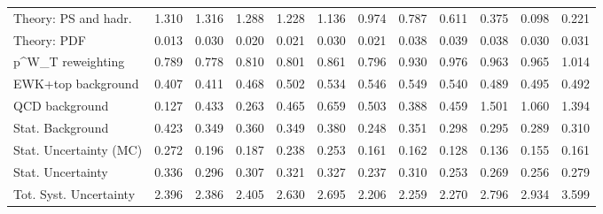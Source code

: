 \begin{tabular}{l|p{0.6cm}p{0.6cm}p{0.6cm}p{0.6cm}p{0.6cm}p{0.6cm}p{0.6cm}p{0.6cm}p{0.6cm}p{0.6cm}p{0.6cm}}
Theory: PS and hadr.                     & 1.310 & 1.316 & 1.288 & 1.228 & 1.136 & 0.974 & 0.787 & 0.611 & 0.375 & 0.098 & 0.221 \\
Theory: PDF                              & 0.013 & 0.030 & 0.020 & 0.021 & 0.030 & 0.021 & 0.038 & 0.039 & 0.038 & 0.030 & 0.031 \\
p^{W}_{T} reweighting                    & 0.789 & 0.778 & 0.810 & 0.801 & 0.861 & 0.796 & 0.930 & 0.976 & 0.963 & 0.965 & 1.014 \\
EWK+top background                       & 0.407 & 0.411 & 0.468 & 0.502 & 0.534 & 0.546 & 0.549 & 0.540 & 0.489 & 0.495 & 0.492 \\
QCD background                           & 0.127 & 0.433 & 0.263 & 0.465 & 0.659 & 0.503 & 0.388 & 0.459 & 1.501 & 1.060 & 1.394 \\
Stat. Background                         & 0.423 & 0.349 & 0.360 & 0.349 & 0.380 & 0.248 & 0.351 & 0.298 & 0.295 & 0.289 & 0.310 \\
Stat. Uncertainty (MC)                   & 0.272 & 0.196 & 0.187 & 0.238 & 0.253 & 0.161 & 0.162 & 0.128 & 0.136 & 0.155 & 0.161 \\
\hline
Stat. Uncertainty                        & 0.336 & 0.296 & 0.307 & 0.321 & 0.327 & 0.237 & 0.310 & 0.253 & 0.269 & 0.256 & 0.279 \\
\hline
Tot. Syst. Uncertainty                   & 2.396 & 2.386 & 2.405 & 2.630 & 2.695 & 2.206 & 2.259 & 2.270 & 2.796 & 2.934 & 3.599 \\
\hline
\end{tabular}
